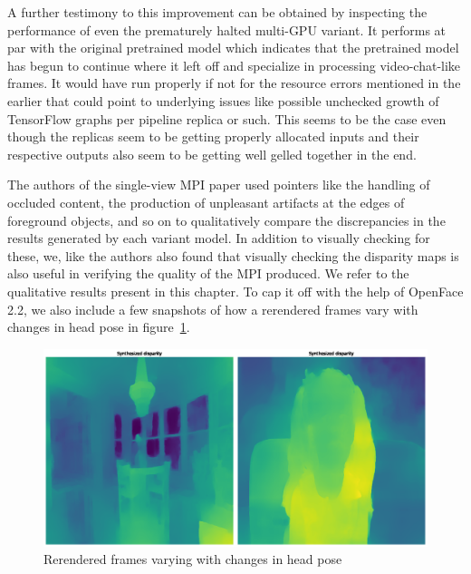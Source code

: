 A further testimony to this improvement can be obtained by inspecting the performance of even the prematurely halted multi-GPU variant. It performs at par with the original pretrained model which indicates that the pretrained model has begun to continue where it left off and specialize in processing video-chat-like frames. It would have run properly if not for the resource errors mentioned in the earlier that could point to underlying issues like possible unchecked growth of TensorFlow graphs per pipeline replica or such. This seems to be the case even though the replicas seem to be getting properly allocated inputs and their respective outputs also seem to be getting well gelled together in the end.

The authors of the single-view MPI paper used pointers like the handling of occluded content, the production of unpleasant artifacts at the edges of foreground objects, and so on to qualitatively compare the discrepancies in the results generated by each variant model. In addition to visually checking for these, we, like the authors also found that visually checking the disparity maps is also useful in verifying the quality of the MPI produced. We refer to the qualitative results present in this chapter. To cap it off with the help of OpenFace 2.2, we also include a few snapshots of how a rerendered frames vary with changes in head pose in figure~\ref{fig:rerendered-with-openface}.  

\begin{figure}[!h]
    \includegraphics[width=1\columnwidth]{figures/great-off-kilter-disparity.png}
    \caption{Rerendered frames varying with changes in head pose}
    \label{fig:rerendered-with-openface}
    {\small }  
\end{figure}


